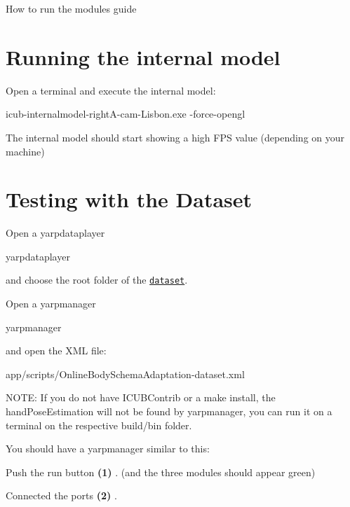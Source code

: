 How to run the modules guide\hypertarget{how_to_use_internalmodel}{}\section{Running the internal model}\label{how_to_use_internalmodel}
Open a terminal and execute the internal model\+: 
\begin{DoxyCode}
icub-internalmodel-rightA-cam-Lisbon.exe -force-opengl 
\end{DoxyCode}
 The internal model should start showing a high F\+PS value (depending on your machine)\hypertarget{how_to_use_with_dataset}{}\section{Testing with the Dataset}\label{how_to_use_with_dataset}
Open a yarpdataplayer 
\begin{DoxyCode}
yarpdataplayer 
\end{DoxyCode}
 and choose the root folder of the \href{https://github.com/vicentepedro/eyeHandCalibrationDataset-Sim}{\tt dataset}.

Open a yarpmanager 
\begin{DoxyCode}
yarpmanager 
\end{DoxyCode}
 and open the X\+ML file\+: 
\begin{DoxyCode}
app/scripts/OnlineBodySchemaAdaptation-dataset.xml 
\end{DoxyCode}
 N\+O\+TE\+: If you do not have I\+C\+U\+B\+Contrib or a make install, the hand\+Pose\+Estimation will not be found by yarpmanager, you can run it on a terminal on the respective build/bin folder.

You should have a yarpmanager similar to this\+:



Push the run button {\bfseries  (1) } . (and the three modules should appear green)

Connected the ports {\bfseries  (2) }.

